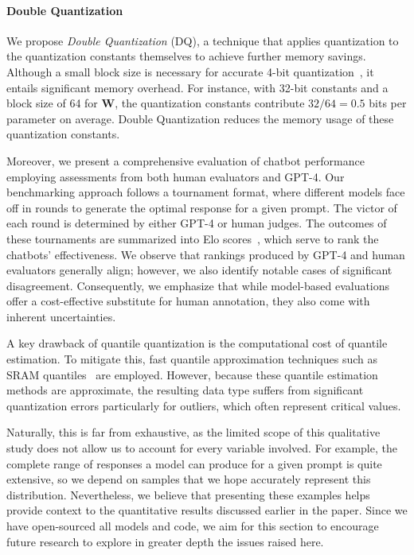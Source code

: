 \paragraph{Double Quantization{}} 
We propose \emph{Double Quantization} (DQ), a technique that applies quantization to the quantization constants themselves to achieve further memory savings. Although a small block size is necessary for accurate 4-bit quantization~\citep{dettmers2022case}, it entails significant memory overhead. For instance, with 32-bit constants and a block size of 64 for $\mathbf{W}$, the quantization constants contribute $32/64 = 0.5$ bits per parameter on average. Double Quantization reduces the memory usage of these quantization constants.

Moreover, we present a comprehensive evaluation of chatbot performance employing assessments from both human evaluators and GPT-4. Our benchmarking approach follows a tournament format, where different models face off in rounds to generate the optimal response for a given prompt. The victor of each round is determined by either GPT-4 or human judges. The outcomes of these tournaments are summarized into Elo scores~\citep{elo1967proposed, elo1978rating}, which serve to rank the chatbots' effectiveness. We observe that rankings produced by GPT-4 and human evaluators generally align; however, we also identify notable cases of significant disagreement. Consequently, we emphasize that while model-based evaluations offer a cost-effective substitute for human annotation, they also come with inherent uncertainties.

A key drawback of quantile quantization is the computational cost of quantile estimation. To mitigate this, fast quantile approximation techniques such as SRAM quantiles~\citep{dettmers2022optimizers} are employed. However, because these quantile estimation methods are approximate, the resulting data type suffers from significant quantization errors particularly for outliers, which often represent critical values.

Naturally, this is far from exhaustive, as the limited scope of this qualitative study does not allow us to account for every variable involved. For example, the complete range of responses a model can produce for a given prompt is quite extensive, so we depend on samples that we hope accurately represent this distribution. Nevertheless, we believe that presenting these examples helps provide context to the quantitative results discussed earlier in the paper. Since we have open-sourced all models and code, we aim for this section to encourage future research to explore in greater depth the issues raised here.  
